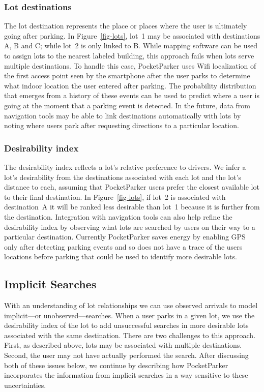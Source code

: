 \subsubsection{Lot destinations}

The lot destination represents the place or places where the user is
ultimately going after parking. In Figure~\ref{fig-lots}, lot~1 may be
associated with destinations A, B and C; while lot~2 is only linked to B.
While mapping software can be used to assign lots to the nearest labeled
building, this approach fails when lots serve multiple destinations. To
handle this case, PocketParker uses Wifi localization of the first access
point seen by the smartphone after the user parks to determine what indoor
location the user entered after parking. The probability distribution that
emerges from a history of these events can be used to predict where a user is
going at the moment that a parking event is detected. In the future, data
from navigation tools may be able to link destinations automatically with
lots by noting where users park after requesting directions to a particular
location.

\subsubsection{Desirability index}

The desirability index reflects a lot's relative preference to drivers. We
infer a lot's desirability from the destinations associated with each lot and
the lot's distance to each, assuming that PocketParker users prefer the
closest available lot to their final destination. In Figure~\ref{fig-lots},
if lot~2 is associated with destination~A it will be ranked less desirable
than lot~1 because it is further from the destination. Integration with
navigation tools can also help refine the desirability index by observing
what lots are searched by users on their way to a particular destination.
Currently PocketParker saves energy by enabling GPS only after detecting
parking events and so does not have a trace of the users locations before
parking that could be used to identify more desirable lots.

\subsection{Implicit Searches}

With an understanding of lot relationships we can use observed arrivals to
model implicit---or unobserved---searches. When a user parks in a given lot,
we use the desirability index of the lot to add unsuccessful searches in more
desirable lots associated with the same destination. There are two challenges
to this approach. First, as described above, lots may be associated with
multiple destinations. Second, the user may not have actually performed the
search. After discussing both of these issues below, we continue by
describing how PocketParker incorporates the information from implicit
searches in a way sensitive to these uncertainties.

